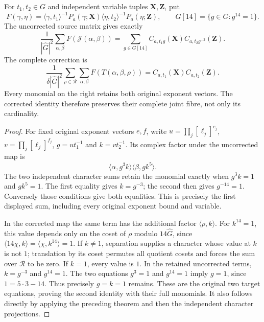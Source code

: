 \begin{theorem}
\label{thm:ns-sieve-alias-removal}
For $t_1,t_2\in G$ and independent variable tuples $\mathbf X,
\mathbf Z$, put
\[
 F(\gamma,\eta)=
  \langle\gamma,t_1\rangle^{-1}P_a(\gamma;\mathbf X)
  \langle\eta,t_2\rangle^{-1}P_a(\eta;\mathbf Z),
 \qquad G[14]=\{g\in G:g^{14}=1\}.
\]
The uncorrected source matrix gives exactly
\[
 \frac1{|\widehat G|^2}\sum_{\alpha,\beta}
          F(\mathcal J(\alpha,\beta))
   =\sum_{g\in G[14]}
       C_{a,t_1g}(\mathbf X)C_{a,t_2g^{-3}}(\mathbf Z).
\]
The complete correction is
\[
 \frac1{\delta|\widehat G|^2}
     \sum_{\rho\in\mathcal R}\sum_{\alpha,\beta}
          F(T(\alpha,\beta,\rho))
       = C_{a,t_1}(\mathbf X)C_{a,t_2}(\mathbf Z).
\]
Every monomial on the right retains both original exponent vectors.
The corrected identity therefore preserves their complete joint
fibre, not only its cardinality.
\end{theorem}
\begin{proof}
For fixed original exponent vectors $e,f$, write
$u=\prod_j[\ell_j]^{e_j}$, $v=\prod_j[\ell_j]^{f_j}$,
$g=ut_1^{-1}$ and $k=vt_2^{-1}$. Its complex factor under the
uncorrected map is
\[
 \langle\alpha,g^3k\rangle\langle\beta,gk^5\rangle.
\]
The two independent character sums retain the monomial exactly when
$g^3k=1$ and $gk^5=1$. The first equality gives $k=g^{-3}$;
the second then gives $g^{-14}=1$. Conversely those conditions
give both equalities. This is precisely the first displayed sum,
including every original exponent bound and variable.

In the corrected map the same term has the additional factor
$\langle\rho,k\rangle$. For $k^{14}=1$, this value depends only
on the coset of $\rho$ modulo $14\widehat G$, since
$\langle14\chi,k\rangle=\langle\chi,k^{14}\rangle=1$.
If $k\ne1$, separation supplies a character whose value at $k$ is not $1$;
translation by its coset permutes all quotient cosets and forces
the sum over $\mathcal R$ to be zero. If $k=1$, every value is
$1$. In the retained uncorrected terms, $k=g^{-3}$ and $g^{14}=1$.
The two equations $g^3=1$ and $g^{14}=1$ imply $g=1$, since
$1=5\cdot3-14$. Thus precisely $g=k=1$ remains. These are the
original two target equations, proving the second identity with
their full monomials. It also follows directly by applying the
preceding theorem and then the independent character projections.
\end{proof}

